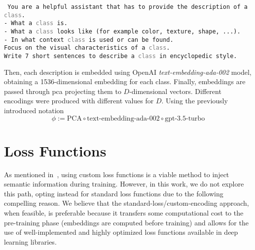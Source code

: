 \begin{minipage}{0.9\linewidth}
\texttt{\small
You are a helpful assistant that has to provide the description of a
\textquotesingle\textcolor{gray}{\texttt{class}}\textquotesingle.\\
- What a \textquotesingle\textcolor{gray}{\texttt{class}}\textquotesingle\ is.\\
- What a \textquotesingle\textcolor{gray}{\texttt{class}}\textquotesingle\ looks like (for example color,
texture, shape, ...).\\
- In what context \textquotesingle\textcolor{gray}{\texttt{class}}\textquotesingle\ is used or can be
found.\\
Focus on the visual characteristics of a \textquotesingle\textcolor{gray}{\texttt{class}}\textquotesingle.\\
Write 7 short sentences to describe a \textquotesingle\textcolor{gray}{\texttt{class}}\textquotesingle\ in
encyclopedic style.
}
\end{minipage}

\vspace{10pt}

Then, each description is embedded using OpenAI \emph{text-embedding-ada-002} model, obtaining a 1536-dimensional embedding for each class. Finally, embeddings are passed through \acrshort{pca} projecting them to $D$-dimensional vectors. Different encodings were produced with different values for $D$.
Using the previously introduced notation
\begin{equation}
  \phi := \textrm{PCA} \circ \textrm{text-embedding-ada-002} \circ
  \textrm{gpt-3.5-turbo}
  \label{eq:desc-pca}
\end{equation}


\section{Loss Functions}
\label{sec:losses}

As mentioned in~, using custom loss functions is a viable method to inject semantic information during training. However, in this work, we do not explore this path, opting instead for standard loss functions due to the following compelling reason.
We believe that the standard-loss/custom-encoding approach, when feasible, is preferable because it transfers some computational cost to the pre-training phase (embeddings are computed before training) and allows for the use of well-implemented and highly optimized loss functions available in deep learning libraries.

